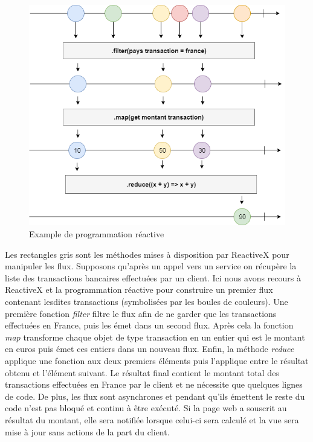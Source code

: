 \begin{figure}[h!]
	\includegraphics[scale=0.50]{images/travailBP1818/architecture/reactivex.png}
	\centering
	\caption{Example de programmation réactive}
	\label{reactivex}
\end{figure}

	Les rectangles gris sont les méthodes mises à disposition par ReactiveX pour manipuler les flux. Supposons qu'après un appel vers un service on récupère la liste des transactions bancaires effectuées par un client. Ici nous avons recours à ReactiveX et la programmation réactive pour construire un premier flux contenant lesdites transactions (symbolisées par les boules de couleurs). Une première fonction \textit{filter} filtre le flux afin de ne garder que les transactions effectuées en France, puis les émet dans un second flux. Après cela la fonction \textit{map} transforme chaque objet de type transaction en un entier qui est le montant en euros puis émet ces entiers dans un nouveau flux. Enfin, la méthode \textit{reduce} applique une fonction aux deux premiers éléments puis l'applique entre le résultat obtenu et l'élément suivant. Le résultat final contient le montant total des transactions effectuées en France par le client et ne nécessite que quelques lignes de code. De plus, les flux sont asynchrones et pendant qu'ils émettent le reste du code n'est pas bloqué et continu à être exécuté. Si la page web a souscrit au résultat du montant, elle sera notifiée lorsque celui-ci sera calculé et la vue sera mise à jour sans actions de la part du client. \\

